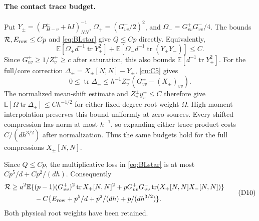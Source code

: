 \documentclass[10pt]{article}
\numberwithin{equation}{section}
\newcommand{\1}{\mathbf1}
\begin{document}
\paragraph{The contact trace budget.}
Put $Y_\pm=(P^\pm_{H-v}+hI)^{-1}_{NN}$,
$\Omega_+=(G^+_{vv}/2)^2$, and
$\Omega_-=G^+_{vv}G^-_{vv}/4$.
The bounds $\mathcal R,E_{\rm row}\le Cp$ and
\eqref{eq:BLstar} give $Q\le Cp$ directly. Equivalently,
\[
 \mathbb E[\Omega_+d^{-1}\operatorname{tr}Y_+^2]
 +\mathbb E[\Omega_-d^{-1}\operatorname{tr}(Y_+Y_-)]\le C.
 \tag{D9b}\label{eq:contact-trace-budget}
\]
Since $G^+_{vv}\ge1/Z_v^+\ge c$ after saturation, this also bounds
$\mathbb E[d^{-1}\operatorname{tr}Y_+^2]$.
For the full/core correction $\Delta_\pm=X_\pm[N,N]-Y_\pm$,
\eqref{cu:C5} gives
\[
 0\le\operatorname{tr}\Delta_\pm
 \le h^{-1}Z_v^\pm(G^\pm_{vv}-(X_\pm)_{vv}).
\]
The normalized mean-shift estimate and $Z_v^\pm y_v^\pm\le C$
therefore give $\mathbb E[\Omega\operatorname{tr}\Delta_\pm]
\le Ch^{-1/2}$ for either fixed-degree root weight $\Omega$.
High-moment interpolation preserves this bound uniformly at zero
sources. Every shifted compression has norm at most $h^{-1}$, so
expanding either trace product costs $C/(dh^{3/2})$ after normalization.
Thus the same budgets hold for the full compressions $X_\pm[N,N]$.

Since $Q\le Cp$, the multiplicative loss in \eqref{eq:BLstar}
is at most $Cp^5/d+Cp^2/(dh)$.
Consequently
\[
 \begin{split}
 \mathcal R\ge a^2\mathbb E\{&
 (p-1)(G^+_{vv})^2\operatorname{tr}X_+[N,N]^2
 +pG^+_{vv}G^-_{vv}\operatorname{tr}(X_+[N,N]X_-[N,N])\}\\
 &-C\{E_{\rm row}+p^5/d+p^2/(dh)+p/(dh^{3/2})\}.
 \end{split}\tag{D10}\label{eq:compressed-positive-trace}
\]
Both physical root weights have been retained.
\end{document}
